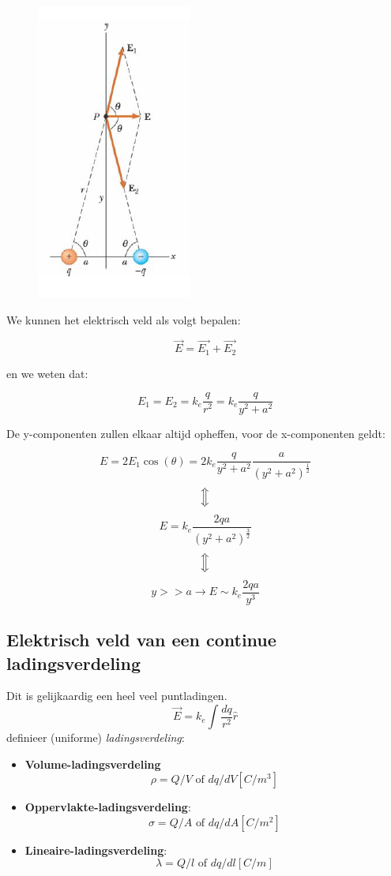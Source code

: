 \documentclass[12pt,a4paper]{article}
\newcommand{\Luda}{\Big\Updownarrow}
\begin{document}
    \begin{figure}
	\centering
	\includegraphics[width=0.3\linewidth]{dipool_elektrische_veld}
	\label{dev}
    \end{figure}

    We kunnen het elektrisch veld als volgt bepalen:

    $$\vec{E} = \vec{E_{1}} + \vec{E_{2}}$$

    en we weten dat:

    $$E_{1} = E_{2} = k_{e} \frac{q}{r^{2}} = k_{e}\frac{q}{y^{2} + a^{2}}$$


    De y-componenten zullen elkaar altijd opheffen, voor de x-componenten geldt:

    $$E = 2E_{1}\cos(\theta) = 2k_{e}\frac{q}{y^{2} + a^{2}}\frac{a}{(y^{2} + a^{2})^{\frac{1}{2}}}$$
    $$\Luda$$
    $$E = k_{e}\frac{2qa}{(y^{2} + a^{2})^{\frac{3}{2}}}$$
    $$\Luda$$
    $$y >> a \to E \sim k_{e}\frac{2qa}{y^{3}}$$

    \subsection{Elektrisch veld van een continue ladingsverdeling}
	Dit is gelijkaardig een heel veel puntladingen. 
	\[\vec{E} = k_e\int\frac{dq}{r^2}\hat{r}\]
	definieer (uniforme) \textit{ladingsverdeling}:
	\begin{itemize}
		\item \textbf{Volume-ladingsverdeling}
		 \[\rho = Q/V \text{ of } dq/dV [C/m^3]\]
		\item \textbf{Oppervlakte-ladingsverdeling}:
		 \[\sigma = Q/A \text{ of } dq/dA [C/m^2]\]
		\item \textbf{Lineaire-ladingsverdeling}:
		 \[\lambda = Q/l \text{ of } dq/dl [C/m]\]
	\end{itemize}
\end{document}
